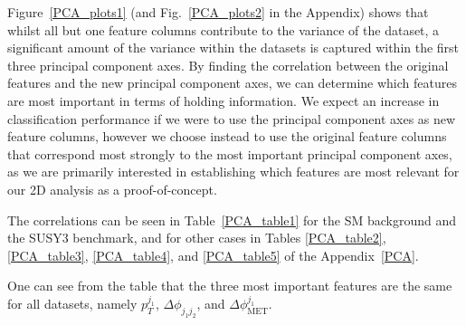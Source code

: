 \documentclass[prd,aps,letterpaper,floatfix,superscriptaddress,preprintnumbers,twocolumn,10pt,nofootinbib]{revtex4-1}
\begin{document}
Figure~\ref{PCA_plots1} (and Fig.~\ref{PCA_plots2} in the Appendix) shows that whilst all but one feature columns contribute to the variance of the dataset, a significant amount of the variance within the datasets is captured
within the first three principal component axes. By finding the correlation between the original features and the new principal component axes, we can determine which features are most important in terms of holding information. We expect an increase in classification performance if we were to use the principal component axes as new feature columns, however we choose instead to use the original feature columns that correspond most strongly to the most important principal component axes, as we are primarily interested in establishing which features are most relevant for our 2D analysis as a proof-of-concept. 

The correlations can be seen in Table~\ref{PCA_table1} for the SM background and the SUSY3 benchmark, and for other cases in Tables \ref{PCA_table2}, \ref{PCA_table3}, \ref{PCA_table4}, and \ref{PCA_table5} of the Appendix~\ref{PCA}. 

One can see from the table that the three most important features are the same for all datasets, namely  $p_T^{j_1}$, $\Delta \phi_{j_1j_2}$, and $\Delta \phi_{\text{MET}}^{j_1}$.
\end{document}
